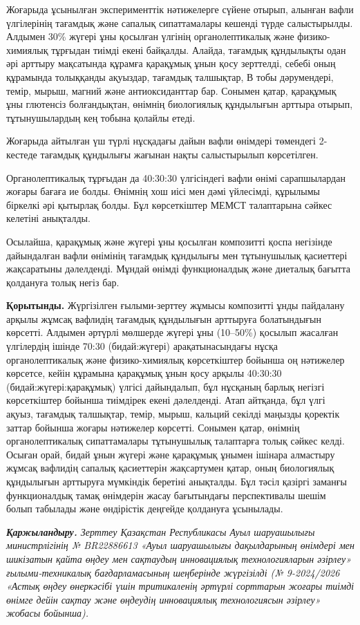 \begin{multicols}{2}
Жоғарыда ұсынылған эксперименттік нәтижелерге сүйене отырып, алынған
вафли үлгілерінің тағамдық және сапалық сипаттамалары кешенді түрде
салыстырылды. Алдымен 30\% жүгері ұны қосылған үлгінің органолептикалық
және физико-химиялық тұрғыдан тиімді екені байқалды. Алайда, тағамдық
құндылықты одан әрі арттыру мақсатында құрамға қарақұмық ұнын қосу
зерттелді, себебі оның құрамында толыққанды ақуыздар, тағамдық
талшықтар, В тобы дәрумендері, темір, мырыш, магний және антиоксиданттар
бар. Сонымен қатар, қарақұмық ұны глютенсіз болғандықтан, өнімнің
биологиялық құндылығын арттыра отырып, тұтынушылардың кең тобына қолайлы
етеді.

Жоғарыда айтылған үш түрлі нұсқадағы дайын вафли өнімдері төмендегі
2-кестеде тағамдық құндылығы жағынан нақты салыстырылып көрсетілген.

Органолептикалық тұрғыдан да 40:30:30 үлгісіндегі вафли өнімі
сарапшылардан жоғары бағаға ие болды. Өнімнің хош иісі мен дәмі
үйлесімді, құрылымы біркелкі әрі қытырлақ болды. Бұл көрсеткіштер МЕМСТ
талаптарына сәйкес келетіні анықталды.

Осылайша, қарақұмық және жүгері ұны қосылған композитті қоспа негізінде
дайындалған вафли өнімінің тағамдық құндылығы мен тұтынушылық қасиеттері
жақсаратыны дәлелденді. Мұндай өнімді функционалдық және диеталық
бағытта қолдануға толық негіз бар.

{\bfseries Қорытынды.} Жүргізілген ғылыми-зерттеу жұмысы композитті ұнды
пайдалану арқылы жұмсақ вафлидің тағамдық құндылығын арттыруға
болатындығын көрсетті. Алдымен әртүрлі мөлшерде жүгері ұны (10--50\%)
қосылып жасалған үлгілердің ішінде 70:30 (бидай:жүгері) арақатынасындағы
нұсқа органолептикалық және физико-химиялық көрсеткіштер бойынша оң
нәтижелер көрсетсе, кейін құрамына қарақұмық ұнын қосу арқылы 40:30:30
(бидай:жүгері:қарақұмық) үлгісі дайындалып, бұл нұсқаның барлық негізгі
көрсеткіштер бойынша тиімдірек екені дәлелденді. Атап айтқанда, бұл үлгі
ақуыз, тағамдық талшықтар, темір, мырыш, кальций секілді маңызды
қоректік заттар бойынша жоғары нәтижелер көрсетті. Сонымен қатар,
өнімнің органолептикалық сипаттамалары тұтынушылық талаптарға толық
сәйкес келді. Осыған орай, бидай ұнын жүгері және қарақұмық ұнымен
ішінара алмастыру жұмсақ вафлидің сапалық қасиеттерін жақсартумен қатар,
оның биологиялық құндылығын арттыруға мүмкіндік беретіні анықталды. Бұл
тәсіл қазіргі заманғы функционалдық тамақ өнімдерін жасау бағытындағы
перспективалы шешім болып табылады және өндірістік деңгейде қолдануға
ұсынылады.

\emph{{\bfseries Қаржыландыру.} Зерттеу Қазақстан Республикасы Ауыл
шаруашылығы министрлігінің № BR22886613 «Ауыл шаруашылығы дақылдарының
өнімдері мен шикізатын қайта өңдеу мен сақтаудың инновациялық
технологияларын әзірлеу» ғылыми-техникалық бағдарламасының шеңберінде
жүргізілді (№ 9-2024/2026 «Астық өңдеу өнеркәсібі үшін тритикаленің
әртүрлі сорттарын жоғары тиімді өнімге дейін сақтау және өңдеудің
инновациялық технологиясын әзірлеу» жобасы бойынша).}
\end{multicols}

